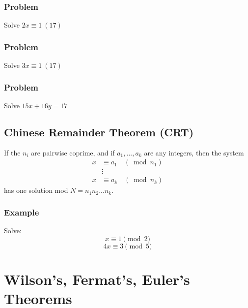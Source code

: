 \documentclass{article}
\begin{document}
\subsubsection{Problem}
Solve $2x\equiv 1 \ (17)$
\vspace{40px}
\subsubsection{Problem}
Solve $3x\equiv 1 \ (17)$
\vspace{40px}
\subsubsection{Problem}
Solve $15x+16y=17$
\vspace{40px}
\subsection{Chinese Remainder Theorem (CRT)}
If the $n_{i}$ are pairwise coprime, and if $a_1, ..., a_k$ are any integers, then the system
$$\begin{aligned}
    x & \equiv a_{1} \quad\left(\bmod n_{1}\right) \\
    & \vdots \\
    x & \equiv a_{k} \quad\left(\bmod n_{k}\right)
    \end{aligned}$$
has one solution mod $N=n_1 n_2 ... n_k$.
\subsubsection{Example}
Solve:
\[x\equiv 1 \pmod 2\]\[4x\equiv 3 \pmod 5\]
\vspace{50px}

\section{Wilson's, Fermat's, Euler's Theorems}
\end{document}
